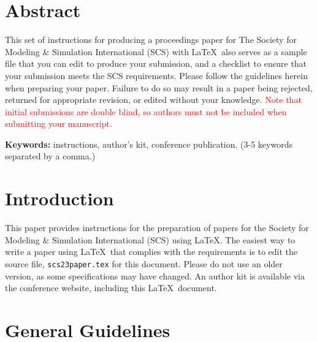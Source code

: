 \documentclass{scspaperproc}
\theoremstyle{scsthe}
\begin{document}
\maketitle

\section*{Abstract}

This set of instructions for producing a proceedings paper for The Society for Modeling \& Simulation International (SCS) with \LaTeX\ also serves as a sample file that you can edit to produce your submission, and a checklist to ensure that your submission meets the SCS requirements. Please follow the guidelines herein when preparing your paper. Failure to do so may result in a paper being rejected, returned for appropriate revision, or edited without your knowledge. \textcolor{red}{Note that initial submissions are double blind, so authors must not be included when submitting your manuscript.}

\textbf{Keywords:} instructions, author’s kit, conference publication. (3-5 keywords separated by a comma.)

\section{Introduction}
\label{sec:intro}

This paper provides instructions for the preparation of papers for the Society for Modeling \& Simulation International (SCS) using \LaTeX. 
The easiest way to write a paper using \LaTeX\ that complies with the requirements is to edit the source file, \texttt{scs23paper.tex} for this document. Please do not use an older version, as some specifications may have changed. An author kit is available via the conference website, including this \LaTeX\ document. 

\section{General Guidelines}
\end{document}
